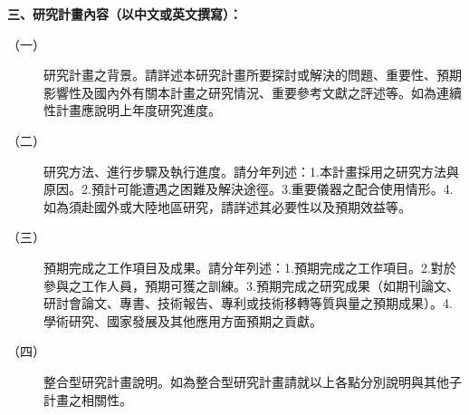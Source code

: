 \documentclass[12pt,a4paper]{article}
\begin{document}
\newtheorem{thm}{Theorem}
\newtheorem{lem}{Lemma}
\newtheorem{cor}{Corollary}
\newtheorem{prop}{Proposition}
\newtheorem{conj}{Conjecture}

\baselineskip 7mm

\noindent
\textbf{\large  三、研究計畫內容（以中文或英文撰寫）：}
\begin{description}
\item[（一）]  研究計畫之背景。請詳述本研究計畫所要探討或解決的問題、重要性、預期影響性及國內外有關本計畫之研究情況、重要參考文獻之評述等。如為連續性計畫應說明上年度研究進度。


\item[（二）] 研究方法、進行步驟及執行進度。請分年列述：1.本計畫採用之研究方法與原因。2.預計可能遭遇之困難及解決途徑。3.重要儀器之配合使用情形。4.如為須赴國外或大陸地區研究，請詳述其必要性以及預期效益等。

\item[（三）] 預期完成之工作項目及成果。請分年列述：1.預期完成之工作項目。2.對於參與之工作人員，預期可獲之訓練。3.預期完成之研究成果（如期刊論文、研討會論文、專書、技術報告、專利或技術移轉等質與量之預期成果）。4.學術研究、國家發展及其他應用方面預期之貢獻。

\item[（四）] 整合型研究計畫說明。如為整合型研究計畫請就以上各點分別說明與其他子計畫之相關性。


\end{description}


\label{LastPage}
\end{document}
